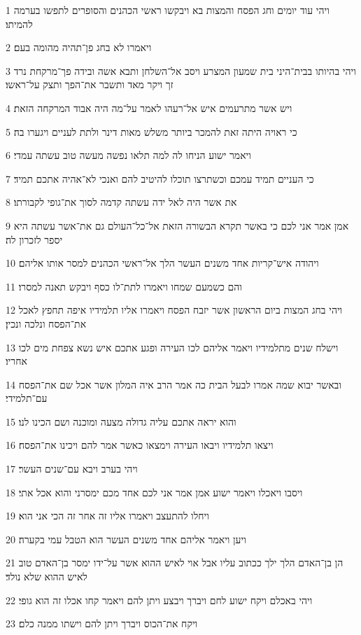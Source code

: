 \par 1 ויהי עוד יומים וחג הפסח והמצות בא ויבקשו ראשי הכהנים והסופרים לתפשו בערמה להמיתו׃
\par 2 ויאמרו לא בחג פן־תהיה מהומה בעם׃
\par 3 ויהי בהיותו בבית־היני בית שמעון המצרע ויסב אל־השלחן ותבא אשה ובידה פך־מרקחת נרד זך ויקר מאד ותשבר את־הפך ותצק על־ראשו׃
\par 4 ויש אשר מתרעמים איש אל־רעהו לאמר על־מה היה אבוד המרקחה הזאת׃
\par 5 כי ראויה היתה זאת להמכר ביותר משלש מאות דינר ולתת לעניים ויגערו בה׃
\par 6 ויאמר ישוע הניחו לה למה תלאו נפשה מעשה טוב עשתה עמדי׃
\par 7 כי העניים תמיד עמכם וכשתרצו תוכלו להיטיב להם ואנכי לא־אהיה אתכם תמיד׃
\par 8 את אשר היה לאל ידה עשתה קדמה לסוך את־גופי לקבורתו׃
\par 9 אמן אמר אני לכם כי באשר תקרא הבשורה הזאת אל־כל־העולם גם את־אשר עשתה היא יספר לזכרון לה׃
\par 10 ויהודה איש־קריות אחד משנים העשר הלך אל־ראשי הכהנים למסר אותו אליהם׃
\par 11 והם כשמעם שמחו ויאמרו לתת־לו כסף ויבקש תאנה למסרו׃
\par 12 ויהי בחג המצות ביום הראשון אשר יזבח הפסח ויאמרו אליו תלמידיו איפה תחפץ לאכל את־הפסח ונלכה ונכין׃
\par 13 וישלח שנים מתלמידיו ויאמר אליהם לכו העירה ופגע אתכם איש נשא צפחת מים לכו אחריו׃
\par 14 ובאשר יבוא שמה אמרו לבעל הבית כה אמר הרב איה המלון אשר אכל שם את־הפסח עם־תלמידי׃
\par 15 והוא יראה אתכם עליה גדולה מצעה ומוכנה ושם הכינו לנו׃
\par 16 ויצאו תלמידיו ויבאו העירה וימצאו כאשר אמר להם ויכינו את־הפסח׃
\par 17 ויהי בערב ויבא עם־שנים העשר׃
\par 18 ויסבו ויאכלו ויאמר ישוע אמן אמר אני לכם אחד מכם ימסרני והוא אכל אתי׃
\par 19 ויחלו להתעצב ויאמרו אליו זה אחר זה הכי אני הוא׃
\par 20 ויען ויאמר אליהם אחד משנים העשר הוא הטבל עמי בקערה׃
\par 21 הן בן־האדם הלך ילך ככתוב עליו אבל אוי לאיש ההוא אשר על־ידו ימסר בן־האדם טוב לאיש ההוא שלא נולד׃
\par 22 ויהי באכלם ויקח ישוע לחם ויברך ויבצע ויתן להם ויאמר קחו אכלו זה הוא גופי׃
\par 23 ויקח את־הכוס ויברך ויתן להם וישתו ממנה כלם׃
